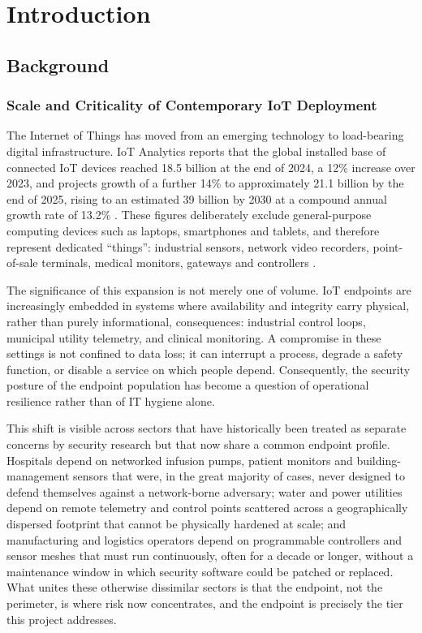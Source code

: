\chapter{Introduction}\label{cha:introduction}

\section{Background}

\subsection{Scale and Criticality of Contemporary IoT Deployment}

The Internet of Things has moved from an emerging technology to load-bearing digital infrastructure. IoT Analytics reports that the global installed base of connected IoT devices reached 18.5 billion at the end of 2024, a 12\% increase over 2023, and projects growth of a further 14\% to approximately 21.1 billion by the end of 2025, rising to an estimated 39 billion by 2030 at a compound annual growth rate of 13.2\% \cite{IoTAnalytics2025}. These figures deliberately exclude general-purpose computing devices such as laptops, smartphones and tablets, and therefore represent dedicated ``things'': industrial sensors, network video recorders, point-of-sale terminals, medical monitors, gateways and controllers \cite{IoTAnalytics2025}.

The significance of this expansion is not merely one of volume. IoT endpoints are increasingly embedded in systems where availability and integrity carry physical, rather than purely informational, consequences: industrial control loops, municipal utility telemetry, and clinical monitoring. A compromise in these settings is not confined to data loss; it can interrupt a process, degrade a safety function, or disable a service on which people depend. Consequently, the security posture of the endpoint population has become a question of operational resilience rather than of IT hygiene alone.

This shift is visible across sectors that have historically been treated as separate concerns by security research but that now share a common endpoint profile. Hospitals depend on networked infusion pumps, patient monitors and building-management sensors that were, in the great majority of cases, never designed to defend themselves against a network-borne adversary; water and power utilities depend on remote telemetry and control points scattered across a geographically dispersed footprint that cannot be physically hardened at scale; and manufacturing and logistics operators depend on programmable controllers and sensor meshes that must run continuously, often for a decade or longer, without a maintenance window in which security software could be patched or replaced. What unites these otherwise dissimilar sectors is that the endpoint, not the perimeter, is where risk now concentrates, and the endpoint is precisely the tier this project addresses.

